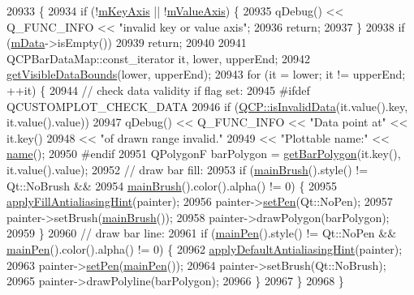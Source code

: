 \begin{DoxyCode}
20933                                       \{
20934   \textcolor{keywordflow}{if} (!\hyperlink{class_q_c_p_abstract_plottable_a426f42e254d0f8ce5436a868c61a6827}{mKeyAxis} || !\hyperlink{class_q_c_p_abstract_plottable_a2901452ca4aea911a1827717934a4bda}{mValueAxis}) \{
20935     qDebug() << Q\_FUNC\_INFO << \textcolor{stringliteral}{"invalid key or value axis"};
20936     \textcolor{keywordflow}{return};
20937   \}
20938   \textcolor{keywordflow}{if} (\hyperlink{class_q_c_p_bars_aef28d29d51ef84b608ecd22c55d531ff}{mData}->isEmpty())
20939     \textcolor{keywordflow}{return};
20940 
20941   QCPBarDataMap::const\_iterator it, lower, upperEnd;
20942   \hyperlink{class_q_c_p_bars_af73d2032be0a64d2692bb76b08c79ec2}{getVisibleDataBounds}(lower, upperEnd);
20943   \textcolor{keywordflow}{for} (it = lower; it != upperEnd; ++it) \{
20944 \textcolor{comment}{// check data validity if flag set:}
20945 \textcolor{preprocessor}{#ifdef QCUSTOMPLOT\_CHECK\_DATA}
20946     \textcolor{keywordflow}{if} (\hyperlink{namespace_q_c_p_a07ab701c05329089f933b9cae2638a63}{QCP::isInvalidData}(it.value().key, it.value().value))
20947       qDebug() << Q\_FUNC\_INFO << \textcolor{stringliteral}{"Data point at"} << it.key()
20948                << \textcolor{stringliteral}{"of drawn range invalid."}
20949                << \textcolor{stringliteral}{"Plottable name:"} << \hyperlink{class_q_c_p_abstract_plottable_a1affc1972938e4364a9325e4e4e4dcea}{name}();
20950 \textcolor{preprocessor}{#endif}
20951     QPolygonF barPolygon = \hyperlink{class_q_c_p_bars_a1d118a76662cfd691a78c6f573e3f78c}{getBarPolygon}(it.key(), it.value().value);
20952     \textcolor{comment}{// draw bar fill:}
20953     \textcolor{keywordflow}{if} (\hyperlink{class_q_c_p_abstract_plottable_ae74c123832da180c17e22203e748d9b7}{mainBrush}().style() != Qt::NoBrush &&
20954         \hyperlink{class_q_c_p_abstract_plottable_ae74c123832da180c17e22203e748d9b7}{mainBrush}().color().alpha() != 0) \{
20955       \hyperlink{class_q_c_p_abstract_plottable_ac08a480155895e674dbfe5a5670e0ff3}{applyFillAntialiasingHint}(painter);
20956       painter->\hyperlink{class_q_c_p_painter_af9c7a4cd1791403901f8c5b82a150195}{setPen}(Qt::NoPen);
20957       painter->setBrush(\hyperlink{class_q_c_p_abstract_plottable_ae74c123832da180c17e22203e748d9b7}{mainBrush}());
20958       painter->drawPolygon(barPolygon);
20959     \}
20960     \textcolor{comment}{// draw bar line:}
20961     \textcolor{keywordflow}{if} (\hyperlink{class_q_c_p_abstract_plottable_a19276ed2382a3a06464417b8788b1451}{mainPen}().style() != Qt::NoPen && \hyperlink{class_q_c_p_abstract_plottable_a19276ed2382a3a06464417b8788b1451}{mainPen}().color().alpha() != 0) \{
20962       \hyperlink{class_q_c_p_abstract_plottable_a76e9d6cc7972dc1528f526d163766aca}{applyDefaultAntialiasingHint}(painter);
20963       painter->\hyperlink{class_q_c_p_painter_af9c7a4cd1791403901f8c5b82a150195}{setPen}(\hyperlink{class_q_c_p_abstract_plottable_a19276ed2382a3a06464417b8788b1451}{mainPen}());
20964       painter->setBrush(Qt::NoBrush);
20965       painter->drawPolyline(barPolygon);
20966     \}
20967   \}
20968 \}
\end{DoxyCode}


